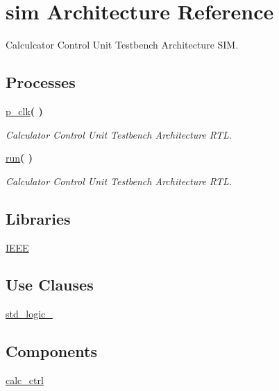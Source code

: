 \hypertarget{classtb__calc__ctrl_1_1sim}{}\section{sim Architecture Reference}
\label{classtb__calc__ctrl_1_1sim}


Calculcator Control Unit Testbench Architecture S\+IM.  


\subsection*{Processes}
 \begin{DoxyCompactItemize}
\item 
\hyperlink{classtb__calc__ctrl_1_1sim_af35c81fcf5e4601a4e5d669b422cf79a}{p\+\_\+clk}{\bfseries  (  )}
\begin{DoxyCompactList}\small\item\em Calculator Control Unit Testbench Architecture R\+TL. \end{DoxyCompactList}\item 
\hyperlink{classtb__calc__ctrl_1_1sim_a0f40b896b2461e250ebafd4e27b8ff54}{run}{\bfseries  (  )}
\begin{DoxyCompactList}\small\item\em Calculator Control Unit Testbench Architecture R\+TL. \end{DoxyCompactList}\end{DoxyCompactItemize}
\subsection*{Libraries}
 \begin{DoxyCompactItemize}
\item 
\hyperlink{classtb__calc__ctrl_1_1sim_ae4f03c286607f3181e16b9aa12d0c6d4}{I\+E\+EE} 
\end{DoxyCompactItemize}
\subsection*{Use Clauses}
 \begin{DoxyCompactItemize}
\item 
\hyperlink{classtb__calc__ctrl_1_1sim_acd03516902501cd1c7296a98e22c6fcb}{std\+\_\+logic\+\_}   
\end{DoxyCompactItemize}
\subsection*{Components}
 \begin{DoxyCompactItemize}
\item 
\hyperlink{classtb__calc__ctrl_1_1sim_a107e48c926f0bc80ef4d44886a9244be}{calc\+\_\+ctrl}  {\bfseries }  
\end{DoxyCompactItemize}
